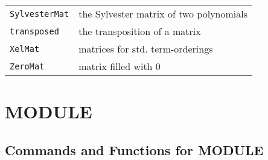 \documentclass[a4paper]{mybook}
\begin{document}
\begin{center}
\begin{longtable}{ll}
{\verb~SylvesterMat~} &
      the Sylvester matrix of two polynomials\\
   
{\verb~transposed~} &
      the transposition of a matrix\\
   
{\verb~XelMat~} &
      matrices for std. term-orderings\\
   
{\verb~ZeroMat~} &
      matrix filled with 0\\
   
\end{longtable}
\end{center}

\noindent



\chapter{MODULE}
\label{MODULE}

      

\section{Commands and Functions for MODULE}
\label{Commands and Functions for MODULE}

        
\end{document}
